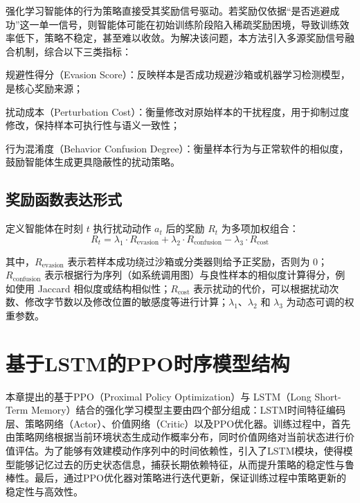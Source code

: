 强化学习智能体的行为策略直接受其奖励信号驱动。若奖励仅依据“是否逃避成功”这一单一信号，则智能体可能在初始训练阶段陷入稀疏奖励困境，导致训练效率低下，策略不稳定，甚至难以收敛。为解决该问题，本方法引入多源奖励信号融合机制，综合以下三类指标：

规避性得分（Evasion Score）：反映样本是否成功规避沙箱或机器学习检测模型，是核心奖励来源；

扰动成本（Perturbation Cost）：衡量修改对原始样本的干扰程度，用于抑制过度修改，保持样本可执行性与语义一致性；

行为混淆度（Behavior Confusion Degree）：衡量样本行为与正常软件的相似度，鼓励智能体生成更具隐蔽性的扰动策略。

\subsection{奖励函数表达形式}

定义智能体在时刻 $t$ 执行扰动动作 $a_t$ 后的奖励 $R_t$ 为多项加权组合：
\begin{equation}
	R_t = \lambda_1 \cdot R_{\text{evasion}} + \lambda_2 \cdot R_{\text{confusion}} - \lambda_3 \cdot R_{\text{cost}}
\end{equation}

其中，$R_{\text{evasion}}$ 表示若样本成功绕过沙箱或分类器则给予正奖励，否则为 0；$R_{\text{confusion}}$ 表示根据行为序列（如系统调用图）与良性样本的相似度计算得分，例如使用 Jaccard 相似度或结构相似性；$R_{\text{cost}}$ 表示扰动的代价，可以根据扰动次数、修改字节数以及修改位置的敏感度等进行计算；$\lambda_1$、$\lambda_2$ 和 $\lambda_3$ 为动态可调的权重参数。

\section{基于LSTM的PPO时序模型结构}

本章提出的基于PPO（Proximal Policy Optimization）与 LSTM（Long Short-Term Memory）结合的强化学习模型主要由四个部分组成：LSTM时间特征编码层、策略网络（Actor）、价值网络（Critic）以及PPO优化器。训练过程中，首先由策略网络根据当前环境状态生成动作概率分布，同时价值网络对当前状态进行价值评估。为了能够有效建模动作序列中的时间依赖性，引入了LSTM模块，使得模型能够记忆过去的历史状态信息，捕获长期依赖特征，从而提升策略的稳定性与鲁棒性。最后，通过PPO优化器对策略进行迭代更新，保证训练过程中策略更新的稳定性与高效性。


